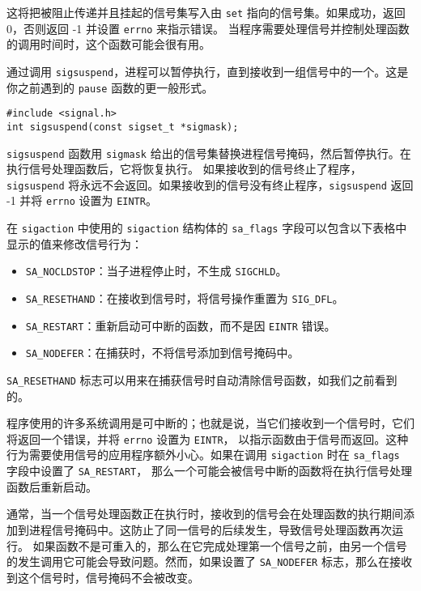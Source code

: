 \documentclass{ctexart}
\begin{document}
这将把被阻止传递并且挂起的信号集写入由 \texttt{set} 指向的信号集。如果成功，返回 0，否则返回 -1 并设置 \texttt{errno} 来指示错误。
当程序需要处理信号并控制处理函数的调用时间时，这个函数可能会很有用。  
  
通过调用 \texttt{sigsuspend}，进程可以暂停执行，直到接收到一组信号中的一个。这是你之前遇到的 \texttt{pause} 函数的更一般形式。  
  
\begin{verbatim}  
#include <signal.h>  
int sigsuspend(const sigset_t *sigmask);  
\end{verbatim}  
  
\texttt{sigsuspend} 函数用 \texttt{sigmask} 给出的信号集替换进程信号掩码，然后暂停执行。在执行信号处理函数后，它将恢复执行。
如果接收到的信号终止了程序，\texttt{sigsuspend} 将永远不会返回。如果接收到的信号没有终止程序，\texttt{sigsuspend} 返回 -1 并将 
\texttt{errno} 设置为 \texttt{EINTR}。  
  
在 \texttt{sigaction} 中使用的 \texttt{sigaction} 结构体的 \texttt{sa\_flags} 字段可以包含以下表格中显示的值来修改信号行为：  
\begin{itemize}  
\item \texttt{SA\_NOCLDSTOP}：当子进程停止时，不生成 \texttt{SIGCHLD}。  
\item \texttt{SA\_RESETHAND}：在接收到信号时，将信号操作重置为 \texttt{SIG\_DFL}。  
\item \texttt{SA\_RESTART}：重新启动可中断的函数，而不是因 \texttt{EINTR} 错误。  
\item \texttt{SA\_NODEFER}：在捕获时，不将信号添加到信号掩码中。  
\end{itemize}  
  
\texttt{SA\_RESETHAND} 标志可以用来在捕获信号时自动清除信号函数，如我们之前看到的。  
  
程序使用的许多系统调用是可中断的；也就是说，当它们接收到一个信号时，它们将返回一个错误，并将 \texttt{errno} 设置为 \texttt{EINTR}，
以指示函数由于信号而返回。这种行为需要使用信号的应用程序额外小心。如果在调用 \texttt{sigaction} 时在 \texttt{sa\_flags} 字段中设置了 \texttt{SA\_RESTART}，
那么一个可能会被信号中断的函数将在执行信号处理函数后重新启动。  
  
通常，当一个信号处理函数正在执行时，接收到的信号会在处理函数的执行期间添加到进程信号掩码中。这防止了同一信号的后续发生，导致信号处理函数再次运行。
如果函数不是可重入的，那么在它完成处理第一个信号之前，由另一个信号的发生调用它可能会导致问题。然而，如果设置了 \texttt{SA\_NODEFER} 标志，那么在接收到这个信号时，信号掩码不会被改变。  
  
\end{document}
